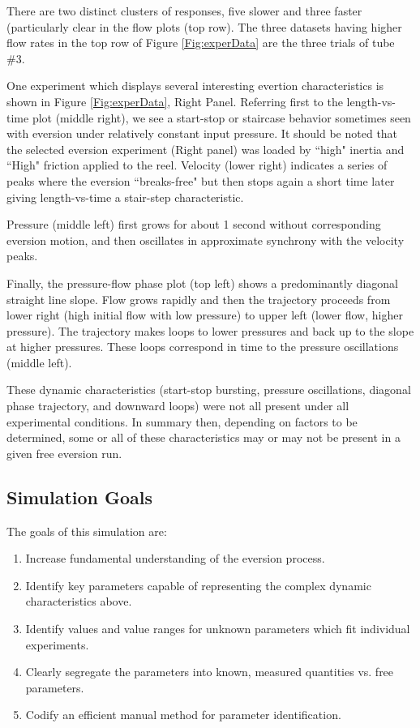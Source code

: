 \documentclass[letterpaper]{article}
\begin{document}
There are two distinct clusters of responses, five slower and three faster (particularly clear
in the flow plots (top row). The three datasets having higher flow rates in the top row of Figure
\ref{Fig:experData} are the three trials of tube \#3.

One experiment which displays several interesting evertion characteristics
is shown in Figure \ref{Fig:experData}, Right Panel.
Referring first to the length-vs-time plot (middle right), we see a start-stop or staircase
behavior sometimes seen with eversion under relatively constant input pressure.   It
should be noted that the selected eversion experiment (Right panel) was loaded by ``high" inertia and
``High" friction applied to the reel.  Velocity (lower right) indicates a series of peaks where the eversion
``breaks-free" but then stops again a short time later giving length-vs-time a stair-step characteristic.

Pressure (middle left) first grows for about 1 second without corresponding eversion motion, and
then oscillates in approximate synchrony with the velocity peaks.

Finally, the pressure-flow phase plot (top left) shows a predominantly diagonal straight line slope.
Flow grows rapidly and then the trajectory proceeds from
lower right (high initial flow with low pressure) to upper left (lower flow, higher pressure).
The trajectory makes loops to lower pressures and back up to the slope at higher pressures.  These
loops correspond in time to the pressure oscillations (middle left).

These dynamic characteristics (start-stop bursting, pressure oscillations, diagonal phase trajectory, and
downward loops) were not all present under all experimental conditions.  In summary then, depending on
factors to be determined, some or all of these characteristics may or may not be present in a given
free eversion run.

\subsection{Simulation Goals}
The goals of this simulation are:
\begin{enumerate}
  \item Increase fundamental understanding of the eversion process.
  \item Identify key parameters capable of representing the complex dynamic characteristics above.
  \item Identify values and value ranges for unknown parameters which fit individual experiments.
  \item Clearly segregate the parameters into known, measured quantities vs. free parameters.
  \item Codify an efficient manual method for parameter identification.
\end{enumerate}
\end{document}
